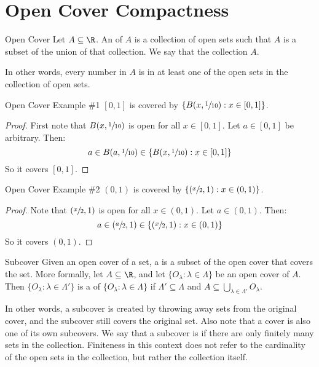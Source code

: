 \section{Open Cover Compactness}
\begin{dfnbox}{Open Cover}{}
    Let $A \subseteq \R$. An  of $A$ is a collection of open sets such that $A$ is a subset of the union of that collection. We say that the collection  $A$.
\end{dfnbox}

In other words, every number in $A$ is in at least one of the open sets in the collection of open sets.

\begin{exbox}{Open Cover Example \#1}{}
    $[0,1]$ is covered by $\left\{ B(x, \sfrac{1}{10}) : x \in [0,1] \right\}$.
    \tcblower
    \begin{proof}
        First note that $B(x, \sfrac{1}{10})$ is open for all $x \in [0,1]$. Let $a \in [0,1]$ be arbitrary. Then:
        \[ a \in B(a, \sfrac{1}{10}) \in \left\{ B(x, \sfrac{1}{10}) : x \in [0,1] \right\} \]
        So it covers $[0,1]$.
    \end{proof}
\end{exbox}

\begin{exbox}{Open Cover Example \#2}{}
    $(0,1)$ is covered by $\left\{ (\sfrac{x}{2}, 1) : x \in (0,1) \right\}$.
    \tcblower
    \begin{proof}
        Note that $(\sfrac{x}{2}, 1)$ is open for all $x \in (0,1)$. Let $a \in (0,1)$. Then:
        \[a \in (\sfrac{a}{2}, 1) \in \left\{ (\sfrac{x}{2}, 1) : x \in (0,1) \right\} \]
        So it covers $(0,1)$.
    \end{proof}
\end{exbox}

\begin{dfnbox}{Subcover}{}
    Given an open cover of a set, a  is a subset of the open cover that covers the set.
    \tcblower
    More formally, let $A \subseteq \R$, and let $\{O_\lambda : \lambda \in \Lambda\}$ be an open cover of $A$. Then $\{ O_\lambda : \lambda \in \Lambda\prime \}$ is a  of $\{O_\lambda : \lambda \in \Lambda \}$ if $\Lambda\prime \subseteq \Lambda$ and $A \subseteq \bigcup_{\lambda \in \Lambda\prime} O_\lambda$.
\end{dfnbox}

In other words, a subcover is created by throwing away sets from the original cover, and the subcover still covers the original set. Also note that a cover is also one of its own subcovers. We say that a subcover is  if there are only finitely many sets in the collection. Finiteness in this context does not refer to the cardinality of the open sets in the collection, but rather the collection itself.

